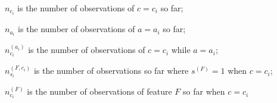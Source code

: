 $n_{c_{i}}$ is the number of observations of $c = c_{i}$ so far;

$n_{a_{i}}$ is the number of observations of $a = a_{i}$ so far;

$n^{(a_{i})}_{c_{i}}$ is the number of observations of $c=c_{i}$ while $a = a_{i}$;

$n^{(F,c_{i})}_{s_{i}}$ is the number of observations so far where $s^{(F)}=1$ when $c = c_{i}$;

$n^{(F)}_{c_{i}}$ is the number of observations of feature $F$ so far when $c = c_{i}$
\eex

